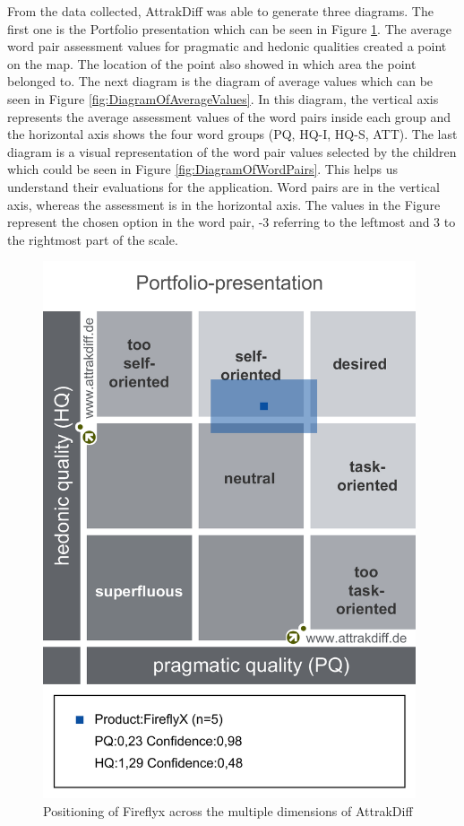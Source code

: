 From the data collected, AttrakDiff was able to generate three diagrams. The first one is the Portfolio presentation which can be seen in Figure \ref{fig:PortfolioOfFireflyX}. The average word pair assessment values for pragmatic and hedonic qualities created a point on the map. The location of the point also showed in which area the point belonged to. The next diagram is the diagram of average values which can be seen in Figure \ref{fig:DiagramOfAverageValues}. In this diagram, the vertical axis represents  the  average  assessment  values  of  the  word  pairs inside each group and the horizontal axis shows the four word groups (PQ, HQ-I, HQ-S, ATT). The last diagram is a visual representation of the word pair values selected by the children which could be seen in Figure \ref{fig:DiagramOfWordPairs}. This helps us understand their evaluations for the application. Word pairs are in the vertical axis, whereas the assessment is in the horizontal axis. The values in the Figure represent the chosen option in the word pair, -3 referring to the leftmost and 3 to the rightmost part of the scale. 
\begin{figure}[H]
    \centering
    \includegraphics[width=11cm]{figures/NewFigures/Portfolio_of_results.png}
    \caption{Positioning of Fireflyx across the multiple dimensions of AttrakDiff}
    \label{fig:PortfolioOfFireflyX}
\end{figure}

